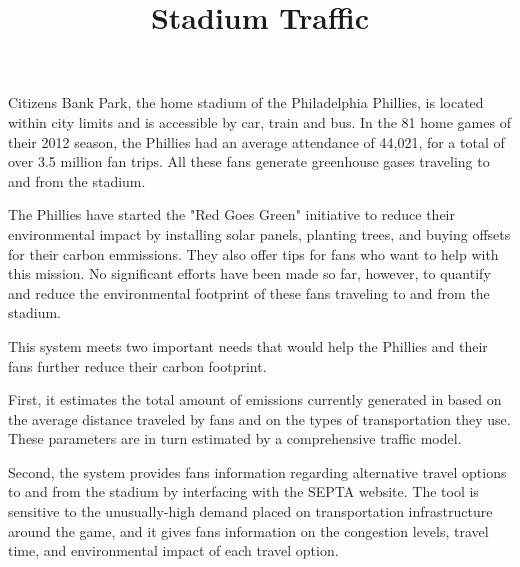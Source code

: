 \documentclass[12pt]{article}
\title{Stadium Traffic}
\begin{document}
\maketitle
\abstract

Citizens Bank Park, the home stadium of the Philadelphia Phillies,
is located within city limits and is accessible by car, train and bus. In
the 81 home games of their 2012 season, the Phillies had an average
attendance of 44,021, for a total of over 3.5 million fan trips. All 
these fans generate greenhouse gases traveling to and from the stadium.

The Phillies have started the "Red Goes Green" initiative to reduce their 
environmental impact by installing solar panels, planting trees, and
buying offsets for their carbon emmissions. They also offer tips for fans who want to help with this mission.
No significant efforts have been made so far, however, to quantify and 
reduce the environmental footprint of these fans traveling to and from 
the stadium.

This system meets two important needs that would help the Phillies and
their fans further reduce their carbon footprint.

First, it estimates the total amount of emissions currently generated in 
based on the average distance traveled by fans and on the types of 
transportation they use. These parameters are in turn estimated by a 
comprehensive traffic model.

Second, the system provides fans information regarding alternative travel
options to and from the stadium by interfacing with the SEPTA website.
The tool is sensitive to the unusually-high demand placed on transportation infrastructure around the game, and it gives fans information on the congestion levels, travel time, and environmental impact of each travel option.
\end{document}
